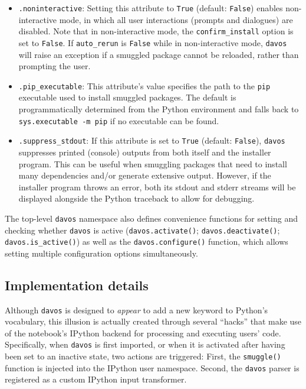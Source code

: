 \documentclass[preprint,12pt,a4paper]{elsarticle}
\begin{document}
\begin{itemize}
\item \texttt{.noninteractive}: Setting this attribute to
  \texttt{True} (default: \texttt{False}) enables non-in\-ter\-act\-ive
  mode, in which all user interactions (prompts and dialogues) are
  disabled. Note that in non-interactive mode, the
  \texttt{confirm\_install} option is set to \texttt{False}.  If
  \texttt{auto\_rerun} is \texttt{False} while in non-interactive
  mode, \texttt{davos} will raise an exception if a smuggled package
  cannot be reloaded, rather than prompting the user.
  
\item \texttt{.pip\_executable}: This attribute's value specifies the
  path to the \texttt{pip} executable used to install smuggled
  packages. The default is programmatically determined from the Python
  environment and falls back to \texttt{sys.executable -m pip} if no
  executable can be found.
  
\item \texttt{.suppress\_stdout}: If this attribute is set to
  \texttt{True} (default: \texttt{False}), \texttt{davos} suppresses
  printed (console) outputs from both itself and the installer program.
  This can be useful when smuggling packages that need to install many
  dependencies and/or generate extensive output. However, if the installer
  program throws an error, both its stdout and stderr streams will be
  displayed alongside the Python traceback to allow for debugging.
\end{itemize}

\noindent The top-level \texttt{davos} namespace also defines
convenience functions for setting and checking whether \texttt{davos}
is active (\texttt{davos.activate()}; \texttt{davos.deactivate()};
\texttt{davos.is\_active()}) as well as the \texttt{davos.configure()}
function, which allows setting multiple configuration options
simultaneously.

\subsection{Implementation details}\label{subsec:implementation}

Although \texttt{davos} is designed to \textit{appear} to add a new
keyword to Python's vocabulary, this illusion is actually created through
several ``hacks'' that make use of the notebook's IPython backend
for processing and executing users' code.  Specifically, when
\texttt{davos} is first imported, or when it is activated after having been
set to an inactive state, two actions are triggered:  First, the
\texttt{smuggle()} function is injected into the IPython user
namespace.  Second, the \texttt{davos} parser is registered as a
custom IPython input transformer.
\end{document}
